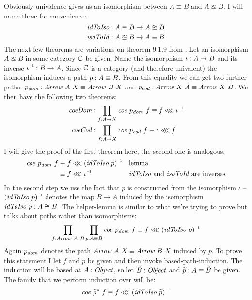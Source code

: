 Obviously univalence gives us an isomorphism between $A \equiv B$ and $A
\approxeq B$. I will name these for convenience:
%
$$
\mathit{idToIso} \mathrel{:} A \equiv B \to A \approxeq B
$$
%
$$
\mathit{isoToId} \mathrel{:} A \approxeq B \to A \equiv B
$$
%
The next few theorems are variations on theorem 9.1.9 from \cite{hott-2013}. Let
an isomorphism $A \approxeq B$ in some category $\mathbb{C}$ be given. Name the
isomorphism $\iota \mathrel{:} A \to B$ and its inverse $\inv{\iota} \tp B \to A$.
Since $\mathbb{C}$ is a category (and therefore univalent) the isomorphism induces a
path $p \mathrel{:} A \equiv B$. From this equality we can get two further paths:
$p_{\mathit{dom}} \mathrel{:} \mathit{Arrow}\ A\ X \equiv \mathit{Arrow}\ B\ X$ and
$p_{\mathit{cod}} \mathrel{:} \mathit{Arrow}\ X\ A \equiv \mathit{Arrow}\ X\ B$. We
then have the following two theorems:
%
\begin{align}
\label{eq:coeDom}
\var{coeDom} & \tp \prod_{f \tp A \to X}
\var{coe}\ p_{\var{dom}}\ f \equiv f \lll \inv{\iota}
\\
\label{eq:coeCod}
\var{coeCod} & \tp \prod_{f \tp A \to X}
\var{coe}\ p_{\var{cod}}\ f \equiv \iota \lll f
\end{align}
%
I will give the proof of the first theorem here, the second one is analogous.
%
\begin{align*}
\var{coe}\ p_{\var{dom}}\ f
  & \equiv f \lll \inv{(\var{idToIso}\ p)} && \text{lemma} \\
  & \equiv f \lll \inv{\iota}
    && \text{$\var{idToIso}$ and $\var{isoToId}$ are inverses}\\
\end{align*}
%
In the second step we use the fact that $p$ is constructed from the isomorphism
$\iota$ -- $\inv{(\var{idToIso}\ p)}$ denotes the map $B \to A$ induced by the
isomorphism $\mathit{idToIso}\ p \mathrel{:} A \cong B$. The helper-lemma is similar to
what we're trying to prove but talks about paths rather than isomorphisms:
%
\begin{equation}
\label{eq:coeDomIso}
\prod_{f \tp \var{Arrow}\ A\ B} \prod_{p \tp A \equiv B}
\var{coe}\ p_{\var{dom}}\ f \equiv f \lll \inv{(\var{idToIso}\ p)}
\end{equation}
%
Again $p_{\mathit{dom}}$ denotes the path $\mathit{Arrow}\ A\ X \equiv
\mathit{Arrow}\ B\ X$ induced by $p$. To prove this statement I let $f$ and $p$
be given and then invoke based-path-induction. The induction will be based at $A
\mathrel{:} \mathit{Object}$, so let $\widetilde{B} \mathrel{:} \mathit{Object}$ and $\widetilde{p} \mathrel{:}
A \equiv \widetilde{B}$ be given. The family that we perform induction over will
be:
%
$$
\var{coe}\ {\widetilde{p}}^*\ f
\equiv
f \lll \inv{(\var{idToIso}\ \widetilde{p})}
$$
